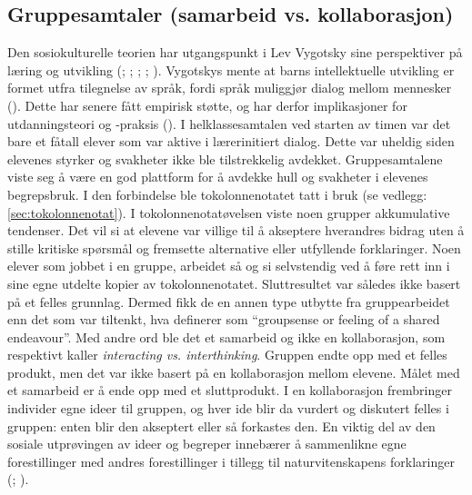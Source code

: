 \documentclass[main.tex]{subfiles}
\begin{document}
\subsection*{Gruppesamtaler (samarbeid vs. kollaborasjon)}
Den sosiokulturelle teorien har utgangspunkt i Lev Vygotsky sine perspektiver på læring og 
utvikling (; ; ; 
; ). Vygotskys 
mente at barns intellektuelle utvikling er formet utfra tilegnelse av språk, fordi språk 
muliggjør dialog mellom mennesker (). Dette har senere fått empirisk
støtte, og har derfor implikasjoner for utdanningsteori og -praksis ().
\newline
\newline
I helklassesamtalen ved starten av timen var det bare et fåtall elever som var aktive i lærerinitiert 
dialog. Dette var uheldig siden elevenes styrker og svakheter ikke ble tilstrekkelig avdekket. 
Gruppesamtalene viste seg å være en god plattform for å avdekke hull og svakheter i elevenes 
begrepsbruk. I den forbindelse ble tokolonnenotatet tatt i bruk (se vedlegg: \ref{sec:tokolonnenotat}).
\newline
\newline
I tokolonnenotatøvelsen viste noen grupper akkumulative tendenser. Det vil si at elevene 
var villige til å akseptere hverandres bidrag uten å stille kritiske spørsmål og fremsette
alternative eller utfyllende forklaringer. Noen elever som jobbet i en gruppe, arbeidet så og si
selvstendig ved å føre rett inn i sine egne utdelte kopier av tokolonnenotatet. Sluttresultet var
således ikke basert på et felles grunnlag. Dermed fikk de en annen type utbytte fra gruppearbeidet
enn det som var tiltenkt, hva   definerer som ``groupsense or feeling of a shared endeavour''. 
Med andre ord ble det et samarbeid og ikke en kollaborasjon, som  respektivt kaller 
\emph{interacting vs. interthinking}. Gruppen endte opp med et felles produkt, men det var ikke 
basert på en kollaborasjon mellom elevene. Målet med et samarbeid er å ende opp med et sluttprodukt. 
I en kollaborasjon frembringer individer egne ideer til gruppen, og hver ide
blir da vurdert og diskutert felles i gruppen: enten blir den akseptert eller så forkastes den.
En viktig del av den sosiale utprøvingen av ideer og begreper innebærer å sammenlikne egne 
forestillinger med andres forestillinger i tillegg til naturvitenskapens forklaringer 
(; ).
\end{document}

